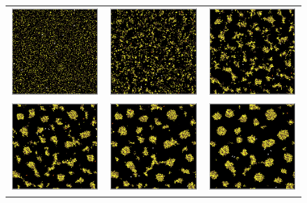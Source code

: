 \begin{enumerate}
\begin{figure}
    \centering
    \begin{tabular}{ccc}
        \includegraphics[width=0.3\hsize]{resources/termitas/11} &
        \includegraphics[width=0.3\hsize]{resources/termitas/12} &
        \includegraphics[width=0.3\hsize]{resources/termitas/13} \\
        
        \includegraphics[width=0.3\hsize]{resources/termitas/14} &
        \includegraphics[width=0.3\hsize]{resources/termitas/15} &
        \includegraphics[width=0.3\hsize]{resources/termitas/16} \\
        

\end{tabular}
\end{figure}
\end{enumerate}
